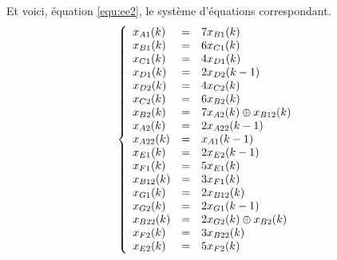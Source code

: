 Et voici, équation \ref{equ:ee2}, le système d'équations correspondant.
\begin{equation}
\label{equ:ee2}
\left\lbrace
\begin{array}{l c l}
x_{A1}(k) &=&	7x_{B1}(k)\\ 
x_{B1}(k) &=&	6x_{C1}(k)\\
x_{C1}(k) &=& 	4x_{D1}(k)\\
x_{D1}(k) &=&	2x_{D2}(k-1)\\
x_{D2}(k) &=&	4x_{C2}(k)\\
x_{C2}(k) &=&	6x_{B2}(k)\\
x_{B2}(k) &=&	7x_{A2}(k) \oplus x_{B12}(k)\\
x_{A2}(k) &=&	2x_{A22}(k-1)\\
x_{A22}(k) &=&	x_{A1}(k-1)\\
x_{E1}(k) &=&	2x_{E2}(k-1)\\
x_{F1}(k) &=&	5x_{E1}(k)\\
x_{B12}(k) &=&	3x_{F1}(k)\\
x_{G1}(k) &=&	2x_{B12}(k)\\
x_{G2}(k) &=&	2x_{G1}(k-1)\\
x_{B22}(k) &=&	2x_{G2}(k) \oplus x_{B2}(k)\\
x_{F2}(k) &=&	3x_{B22}(k)\\
x_{E2}(k) &=&	5x_{F2}(k)   \\  
\end{array}
\right. 
\end{equation}

